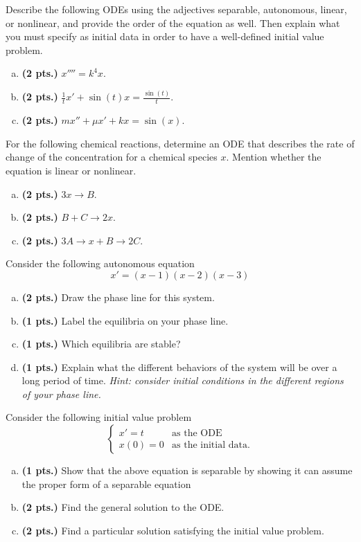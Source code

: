 \documentclass[12pt]{amsbook}
\begin{document}
\begin{problem}
Describe the following ODEs using the adjectives separable, autonomous, linear, or nonlinear, and provide the order of the equation as well. Then explain what you must specify as initial data in order to have a well-defined initial value problem.
\begin{enumerate}[(a)]
	\item \textbf{(2 pts.)} $x'''' = k^4 x$.
	\item \textbf{(2 pts.)} $\frac{1}{t} x' + \sin(t) x = \frac{\sin(t)}{t}$.
	\item \textbf{(2 pts.)} $mx''+\mu x' + kx = \sin(x)$.
\end{enumerate}
\end{problem}

\begin{problem}
For the following chemical reactions, determine an ODE that describes the rate of change of the concentration for a chemical species $x$.  Mention whether the equation is linear or nonlinear.
\begin{enumerate}[(a)]
    \item \textbf{(2 pts.)} $3x \to B$.
    \item \textbf{(2 pts.)} $B+C \to 2x$.
    \item \textbf{(2 pts.)} $3A\to x+B \to 2C$.
\end{enumerate}
\end{problem}

\begin{problem}
Consider the following autonomous equation
\[
x' = (x-1)(x-2)(x-3)
\]
\begin{enumerate}[(a)]
    \item \textbf{(2 pts.)} Draw the phase line for this system.
    \item \textbf{(1 pts.)} Label the equilibria on your phase line.
    \item \textbf{(1 pts.)} Which equilibria are stable?
    \item \textbf{(1 pts.)} Explain what the different behaviors of the system will be over a long period of time. \emph{Hint: consider initial conditions in the different regions of your phase line.}
\end{enumerate}
\end{problem}

\begin{problem}
Consider the following initial value problem
\[
\begin{cases}
x' = t  & \textrm{as the ODE}\\
x(0) = 0 & \textrm{as the initial data}.
\end{cases}
\]
\begin{enumerate}[(a)]
    \item \textbf{(1 pts.)} Show that the above equation is separable by showing it can assume the proper form of a separable equation
	\item \textbf{(2 pts.)} Find the general solution to the ODE.
	\item \textbf{(2 pts.)} Find a particular solution satisfying the initial value problem.
\end{enumerate}
\end{problem}
\end{document}
